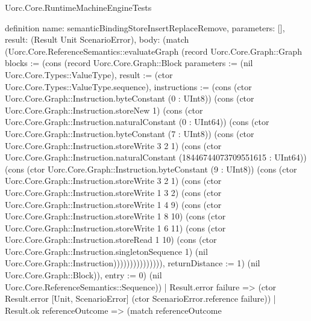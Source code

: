 \begin{lexlean}{Uorc.Core.RuntimeMachineEngineTests}
\begin{semanticmodule}
definition{
  name: semanticBindingStoreInsertReplaceRemove,
  parameters: [],
  result: (Result Unit ScenarioError),
  body: (match (Uorc.Core.ReferenceSemantics::evaluateGraph (record Uorc.Core.Graph::Graph {blocks := (cons (record Uorc.Core.Graph::Block {parameters := (nil Uorc.Core.Types::ValueType), result := (ctor Uorc.Core.Types::ValueType.sequence), instructions := (cons (ctor Uorc.Core.Graph::Instruction.byteConstant (0 : UInt8)) (cons (ctor Uorc.Core.Graph::Instruction.storeNew 1) (cons (ctor Uorc.Core.Graph::Instruction.naturalConstant (0 : UInt64)) (cons (ctor Uorc.Core.Graph::Instruction.byteConstant (7 : UInt8)) (cons (ctor Uorc.Core.Graph::Instruction.storeWrite 3 2 1) (cons (ctor Uorc.Core.Graph::Instruction.naturalConstant (18446744073709551615 : UInt64)) (cons (ctor Uorc.Core.Graph::Instruction.byteConstant (9 : UInt8)) (cons (ctor Uorc.Core.Graph::Instruction.storeWrite 3 2 1) (cons (ctor Uorc.Core.Graph::Instruction.storeWrite 1 3 2) (cons (ctor Uorc.Core.Graph::Instruction.storeWrite 1 4 9) (cons (ctor Uorc.Core.Graph::Instruction.storeWrite 1 8 10) (cons (ctor Uorc.Core.Graph::Instruction.storeWrite 1 6 11) (cons (ctor Uorc.Core.Graph::Instruction.storeRead 1 10) (cons (ctor Uorc.Core.Graph::Instruction.singletonSequence 1) (nil Uorc.Core.Graph::Instruction))))))))))))))), returnDistance := 1}) (nil Uorc.Core.Graph::Block)), entry := 0}) (nil Uorc.Core.ReferenceSemantics::Sequence))
    | Result.error failure => (ctor Result.error [Unit, ScenarioError] (ctor ScenarioError.reference failure))
    | Result.ok referenceOutcome => (match referenceOutcome
}
\end{semanticmodule}
\end{lexlean}
